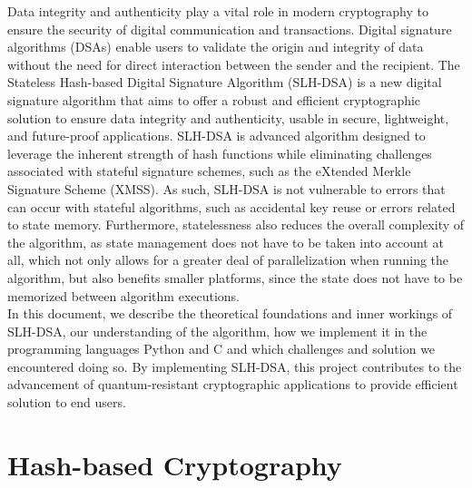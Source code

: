 \documentclass[journal=tosc,notanonymous]{iacrtrans}
\begin{document}
Data integrity and authenticity play a vital role in modern cryptography to ensure the security of digital communication and transactions.
Digital signature algorithms (DSAs) enable users to validate the origin and integrity of data without the need for direct interaction between the sender and the recipient.
The Stateless Hash-based Digital Signature Algorithm (SLH-DSA) is a new digital signature algorithm that aims to offer a robust and efficient cryptographic solution to ensure data integrity and authenticity, usable in secure, lightweight, and future-proof applications.
SLH-DSA is advanced algorithm designed to leverage the inherent strength of hash functions while eliminating challenges associated with stateful signature schemes, such as the eXtended Merkle Signature Scheme (XMSS).
As such, SLH-DSA is not vulnerable to errors that can occur with stateful algorithms, such as accidental key reuse or errors related to state memory.
Furthermore, statelessness also reduces the overall complexity of the algorithm, as state management does not have to be taken into account at all, which not only allows for a greater deal of parallelization when running the algorithm, but also benefits smaller platforms, since the state does not have to be memorized between algorithm executions.
\\
In this document, we describe the theoretical foundations and inner workings of SLH-DSA, our understanding of the algorithm, how we implement it in the programming languages Python and C and which challenges and solution we encountered doing so.
By implementing SLH-DSA, this project contributes to the advancement of quantum-resistant cryptographic applications to provide efficient solution to end users.

\section{Hash-based Cryptography}
\end{document}

